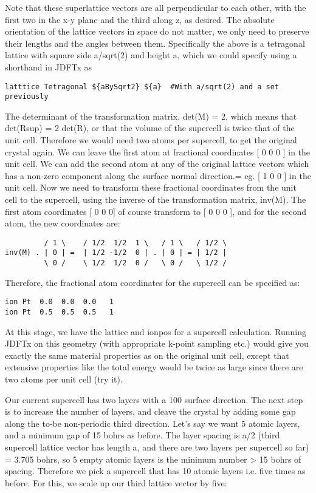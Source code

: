 Note that these superlattice vectors are all perpendicular to each other,
with the first two in the x-y plane and the third along z, as desired.
The absolute orientation of the lattice vectors in space do not matter,
we only need to preserve their lengths and the angles between them.
Specifically the above is a tetragonal lattice with square side a/sqrt(2) and
height a, which we could specify using a shorthand in JDFTx as

\begin{verbatim}
latttice Tetragonal ${aBySqrt2} ${a}  #With a/sqrt(2) and a set previously
\end{verbatim}

The determinant of the transformation matrix, det(M) = 2, which means that det(Rsup) = 2 det(R), or that the volume of the supercell is twice that of the unit cell. Therefore we would need two atoms per supercell, to get the original crystal again. We can leave the first atom at fractional coordinates [ 0 0 0 ] in the unit cell. We can add the second atom at any of the original lattice vectors which has a non-zero component along the surface normal direction.= eg. [ 1 0 0 ] in the unit cell. Now we need to transform these fractional coordinates from the unit cell to the supercell, using the inverse of the transformation matrix, inv(M). The first atom coordinates [ 0 0 0] of course transform to [ 0 0 0 ], and for the second atom, the new coordinates are:

\begin{verbatim}
         / 1 \    / 1/2  1/2  1 \   / 1 \   / 1/2 \
inv(M) . | 0 | =  | 1/2 -1/2  0 | . | 0 | = | 1/2 |
         \ 0 /    \ 1/2  1/2  0 /   \ 0 /   \ 1/2 /
\end{verbatim}

Therefore, the fractional atom coordinates for the supercell can be specified as:

\begin{verbatim}
ion Pt  0.0  0.0  0.0   1
ion Pt  0.5  0.5  0.5   1
\end{verbatim}

At this stage, we have the lattice and ionpos for a supercell calculation.
Running JDFTx on this geometry (with appropriate k-point sampling etc.)
would give you exactly the same material properties as on the
original unit cell, except that extensive properties like the
total energy would be twice as large since there are two atoms per unit cell (try it).

Our current supercell has two layers with a 100 surface direction.
The next step is to increase the number of layers, and cleave the crystal by
adding some gap along the to-be non-periodic third direction.
Let's say we want 5 atomic layers, and a minimum gap of 15 bohrs as before.
The layer spacing is a/2 (third supercell lattice vector has length a, and there are two layers per supercell so far) = 3.705 bohrs, so 5 empty atomic layers is the minimum number > 15 bohrs of spacing.
Therefore we pick a supercell that has 10 atomic layers i.e. five times as before.
For this, we scale up our third lattice vector by five:

